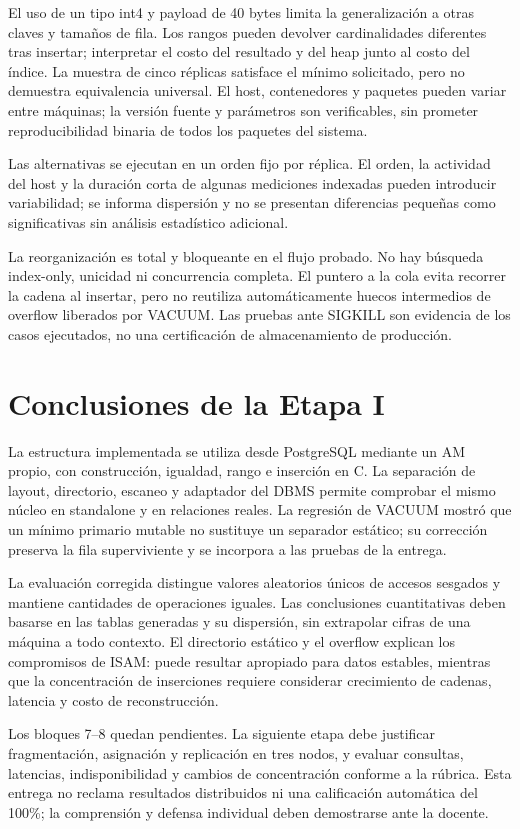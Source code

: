 \documentclass[11pt,a4paper]{article}
\begin{document}
El uso de un tipo int4 y payload de 40 bytes limita la generalización a otras
claves y tamaños de fila. Los rangos pueden devolver cardinalidades diferentes
tras insertar; interpretar el costo del resultado y del heap junto al costo del
índice. La muestra de cinco réplicas satisface el mínimo solicitado, pero no
demuestra equivalencia universal. El host, contenedores y paquetes pueden variar
entre máquinas; la versión fuente y parámetros son verificables, sin prometer
reproducibilidad binaria de todos los paquetes del sistema.

Las alternativas se ejecutan en un orden fijo por réplica. El orden, la actividad
del host y la duración corta de algunas mediciones indexadas pueden introducir
variabilidad; se informa dispersión y no se presentan diferencias pequeñas como
significativas sin análisis estadístico adicional.

La reorganización es total y bloqueante en el flujo probado. No hay búsqueda
index-only, unicidad ni concurrencia completa. El puntero a la cola evita recorrer
la cadena al insertar, pero no reutiliza automáticamente huecos intermedios de
overflow liberados por VACUUM. Las pruebas ante SIGKILL son evidencia de los
casos ejecutados, no una certificación de almacenamiento de producción.

\section{Conclusiones de la Etapa I}
La estructura implementada se utiliza desde PostgreSQL mediante un AM propio,
con construcción, igualdad, rango e inserción en C. La separación de layout,
directorio, escaneo y adaptador del DBMS permite comprobar el mismo núcleo en
standalone y en relaciones reales. La regresión de VACUUM mostró que un mínimo
primario mutable no sustituye un separador estático; su corrección preserva la
fila superviviente y se incorpora a las pruebas de la entrega.

La evaluación corregida distingue valores aleatorios únicos de accesos sesgados
y mantiene cantidades de operaciones iguales. Las conclusiones cuantitativas
deben basarse en las tablas generadas y su dispersión, sin extrapolar cifras de
una máquina a todo contexto. El directorio estático y el overflow explican los
compromisos de ISAM: puede resultar apropiado para datos estables, mientras que
la concentración de inserciones requiere considerar crecimiento de cadenas,
latencia y costo de reconstrucción.

Los bloques 7--8 quedan pendientes. La siguiente etapa debe justificar
fragmentación, asignación y replicación en tres nodos, y evaluar consultas,
latencias, indisponibilidad y cambios de concentración conforme a la rúbrica.
Esta entrega no reclama resultados distribuidos ni una calificación automática
del 100\%; la comprensión y defensa individual deben demostrarse ante la docente.
\end{document}
